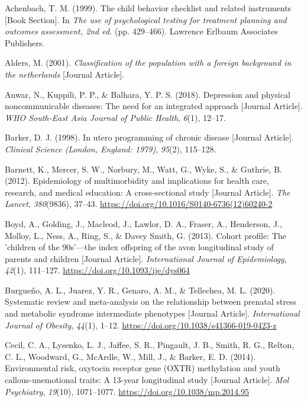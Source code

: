 \documentclass[
  letterpaper,
  DIV=11,
  numbers=noendperiod]{scrreport}
\newlength{\cslhangindent}
\newenvironment{CSLReferences}[2] %
 {\begin{list}{}{%
  \setlength{\itemindent}{0pt}
  \setlength{\leftmargin}{0pt}
  \setlength{\parsep}{0pt}
  \ifodd #1
   \setlength{\leftmargin}{\cslhangindent}
   \setlength{\itemindent}{-1\cslhangindent}
  \fi
  \setlength{\itemsep}{#2\baselineskip}}}
 {\end{list}}
\begin{document}
\label{refs--2}
\begin{CSLReferences}{1}{0}
Achenbach, T. M. (1999). The child behavior checklist and related
instruments {[}Book Section{]}. In \emph{The use of psychological
testing for treatment planning and outcomes assessment, 2nd ed.} (pp.
429--466). Lawrence Erlbaum Associates Publishers.

Alders, M. (2001). \emph{Classification of the population with a foreign
background in the netherlands} {[}Journal Article{]}.

Anwar, N., Kuppili, P. P., \& Balhara, Y. P. S. (2018). Depression and
physical noncommunicable diseases: The need for an integrated approach
{[}Journal Article{]}. \emph{WHO South-East Asia Journal of Public
Health}, \emph{6}(1), 12--17.

Barker, D. J. (1998). In utero programming of chronic disease {[}Journal
Article{]}. \emph{Clinical Science (London, England: 1979)},
\emph{95}(2), 115--128.

Barnett, K., Mercer, S. W., Norbury, M., Watt, G., Wyke, S., \& Guthrie,
B. (2012). Epidemiology of multimorbidity and implications for health
care, research, and medical education: A cross-sectional study
{[}Journal Article{]}. \emph{The Lancet}, \emph{380}(9836), 37--43.
\url{https://doi.org/10.1016/S0140-6736(12)60240-2}

Boyd, A., Golding, J., Macleod, J., Lawlor, D. A., Fraser, A.,
Henderson, J., Molloy, L., Ness, A., Ring, S., \& Davey Smith, G.
(2013). Cohort profile: The 'children of the 90s'---the index offspring
of the avon longitudinal study of parents and children {[}Journal
Article{]}. \emph{International Journal of Epidemiology}, \emph{42}(1),
111--127. \url{https://doi.org/10.1093/ije/dys064}

Burgueño, A. L., Juarez, Y. R., Genaro, A. M., \& Tellechea, M. L.
(2020). Systematic review and meta-analysis on the relationship between
prenatal stress and metabolic syndrome intermediate phenotypes
{[}Journal Article{]}. \emph{International Journal of Obesity},
\emph{44}(1), 1--12. \url{https://doi.org/10.1038/s41366-019-0423-z}

Cecil, C. A., Lysenko, L. J., Jaffee, S. R., Pingault, J. B., Smith, R.
G., Relton, C. L., Woodward, G., McArdle, W., Mill, J., \& Barker, E. D.
(2014). Environmental risk, oxytocin receptor gene (OXTR) methylation
and youth callous-unemotional traits: A 13-year longitudinal study
{[}Journal Article{]}. \emph{Mol Psychiatry}, \emph{19}(10), 1071--1077.
\url{https://doi.org/10.1038/mp.2014.95}


\end{CSLReferences}
\end{document}
